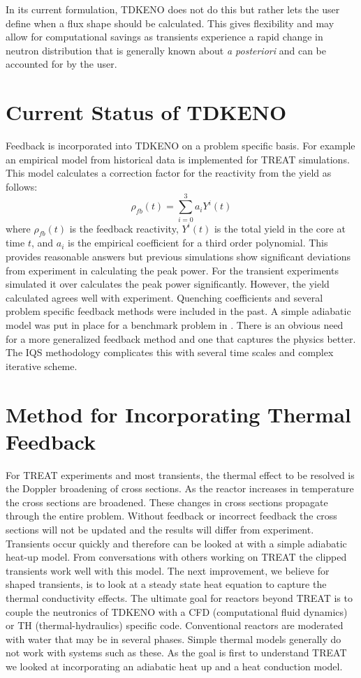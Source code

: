 \documentclass[11pt]{article}
\begin{document}
 In its current formulation, TDKENO does not do this but rather lets the user define when a flux shape should be calculated.  This gives flexibility and may allow for computational savings as transients experience a rapid change in neutron distribution that is generally known about \emph{a posteriori} and can be accounted for by the user. 

\section{Current Status of TDKENO}
Feedback is incorporated into TDKENO on a problem specific basis.  For example an empirical model from historical data is implemented for TREAT simulations. This model calculates a correction factor for the reactivity from the yield as follows:
\begin{equation}
    \rho_{fb}(t) = \sum_{i = 0}^{3}a_i Y^i (t)
\end{equation}
where $\rho_{fb}(t)$ is the feedback reactivity, $Y^i (t)$ is the total yield in the core at time $t$, and $a_i$ is the empirical coefficient for a third order polynomial.
  This provides reasonable answers but previous simulations show significant deviations from experiment in calculating the peak power.  For the transient experiments simulated it over calculates the peak power significantly.  However, the yield calculated agrees well with experiment.
Quenching coefficients and several problem specific feedback methods were included in the past.  A simple adiabatic model was put in place for a benchmark problem in \cite{Bentley}.  There is an obvious need for a more generalized feedback method and one that captures the physics better.  The IQS methodology complicates this with several time scales and complex iterative scheme.  

\section{Method for Incorporating Thermal Feedback}

For TREAT experiments and most transients, the thermal effect to be resolved is the Doppler broadening of cross sections.  As the reactor increases in temperature the cross sections are broadened.  These changes in cross sections propagate through the entire problem.  Without feedback or  incorrect feedback the cross sections will not be updated and the results will differ from experiment.  Transients occur quickly and therefore can be looked at with a simple  adiabatic heat-up model.  From conversations with others working on TREAT the clipped transients work well with this model.  The next improvement, we believe for shaped transients, is to look at a steady state heat equation to capture the thermal conductivity effects.  The ultimate goal for reactors beyond TREAT is to couple the neutronics of TDKENO with a CFD (computational fluid dynamics) or TH (thermal-hydraulics) specific code.  Conventional reactors are moderated with water that may be in several phases.  Simple thermal models generally do not work with systems such as these.  As the goal is first to understand TREAT we looked at incorporating an adiabatic heat up  and a heat conduction model.
\end{document}
